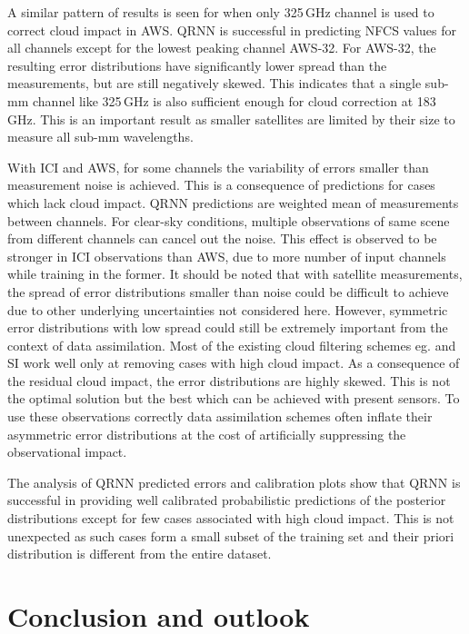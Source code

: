 \documentclass[amt]{copernicus}
\begin{document}
A similar pattern of results is seen for when only 325\,GHz channel is used to correct cloud impact in AWS. QRNN is successful in predicting NFCS values for all channels except for the lowest peaking channel AWS-32. For AWS-32, the resulting error distributions have significantly lower spread than the measurements, but are still negatively skewed. This indicates that a single sub-mm channel like 325\,GHz is also sufficient enough for cloud correction at 183\,GHz. This is an important result as smaller satellites are limited by their size to measure all sub-mm wavelengths.

With ICI and AWS, for some channels the variability of errors smaller than measurement noise is achieved. This is a consequence of predictions for cases which lack cloud impact. QRNN predictions are weighted mean of measurements between channels. For clear-sky conditions, multiple observations of same scene from different channels can cancel out the noise. This effect is observed to be stronger in ICI observations than AWS, due to more number of input channels while training in the former. It should be noted that with satellite measurements, the spread of error distributions smaller than noise could be difficult to achieve due to other underlying uncertainties not considered here. However, symmetric error distributions with low spread could still be extremely important from the context of data assimilation. Most of the existing cloud filtering schemes eg. \citet{buehler:aclou:07} and SI \cite{geer2015scatteringindex} work well only at removing cases with high cloud impact. As a consequence of the residual cloud impact, the error distributions are highly skewed. This is not the optimal solution but the best which can be achieved with present sensors. To use these observations correctly data assimilation schemes often inflate their asymmetric error distributions at the cost of artificially suppressing the observational impact.  

The analysis of QRNN predicted errors and calibration plots show that QRNN is successful in providing well calibrated probabilistic predictions of the posterior distributions except for few cases associated with high cloud impact. This is not unexpected as such cases form a small subset of the training set and their priori distribution is different from the entire dataset. 

\section{Conclusion and outlook}  %
%
\end{document}
